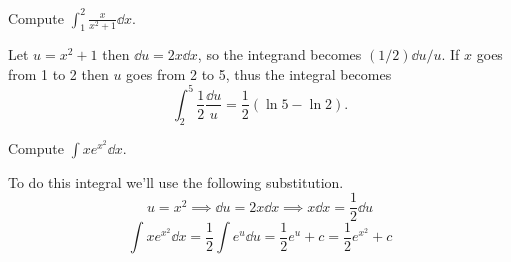 \begin{exercise}
Compute $\displaystyle\int_1^2\frac{x}{x^2+1}\dd{x}$.
\end{exercise}
\begin{solution}
Let $u=x^2+1$ then $\dd{u} = 2x\dd{x}$, so the integrand becomes $(1/2)\dd{u}/u$. If $x$ goes
from 1 to 2 then $u$ goes from 2 to 5, thus the integral becomes
\[ \int_2^5\frac{1}{2}\frac{\dd{u}}{u} = \frac{1}{2}(\ln5-\ln2). \]
\end{solution}

\begin{exercise}
Compute $\int xe^{x^2}\dd{x}$.
\end{exercise}
\begin{solution}
To do this integral we'll use the following substitution.
\[ u=x^2 \implies \dd{u}=2x\dd{x} \implies x\dd{x}=\frac{1}{2}\dd{u} \]
\[ \int x e^{x^2}\dd{x} = \frac{1}{2}\int e^u \dd{u} = \frac{1}{2}e^u + c = \frac{1}{2}e^{x^2} + c \]
\end{solution}

